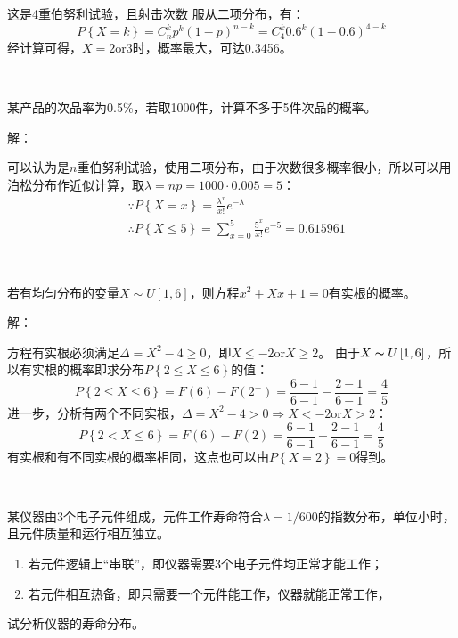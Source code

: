这是4重伯努利试验，且射击次数 服从二项分布，有：
\[
P\left\{ X=k \right\} =C_{n}^{k}p^k\left( 1-p \right) ^{n-k}=C_{4}^{k}0.6^k\left( 1-0.6 \right) ^{4-k}
\]
经计算可得，$X=2\mathrm{or}3$时，概率最大，可达0.3456。

~

\begin{example}
某产品的次品率为0.5\%，若取1000件，计算不多于5件次品的概率。
\end{example}

解：

可以认为是$n$重伯努利试验，使用二项分布，由于次数很多概率很小，所以可以用泊松分布作近似计算，取$\lambda =np=1000\cdot 0.005=5$：
\begin{align*}
&\because P\left\{ X=x \right\} =\frac{\lambda ^x}{x!}e^{-\lambda} \\
&\therefore P\left\{ X\leqslant 5 \right\} =\sum_{x=0}^5{\frac{5^x}{x!}e^{-5}}=0.615961
\end{align*}

~

\begin{example}
若有均匀分布的变量$X\sim U\left[ 1,6 \right] $，则方程$x^2+Xx+1=0$有实根的概率。
\end{example}

解：

方程有实根必须满足$\Delta =X^2-4\geqslant 0$，即$X\leqslant -2 \mathrm{or} X\geqslant 2$。
由于$X\thicksim U\left[ 1,6 \right] $，所以有实根的概率即求分布$P\left\{ 2\leqslant X\leqslant 6 \right\} $的值：
\[
P\left\{ 2\leqslant X\leqslant 6 \right\} =F\left( 6 \right) -F\left( 2^- \right) =\frac{6-1}{6-1}-\frac{2-1}{6-1}=\frac{4}{5}
\]
进一步，分析有两个不同实根，$\Delta =X^2-4>0\Rightarrow X<-2\mathrm{or}X>2$：
\[
P\left\{ 2<X\leqslant 6 \right\} =F\left( 6 \right) -F\left( 2 \right) =\frac{6-1}{6-1}-\frac{2-1}{6-1}=\frac{4}{5}
\]
有实根和有不同实根的概率相同，这点也可以由$P\left\{ X=2 \right\} =0$得到。

~

\begin{example}
某仪器由3个电子元件组成，元件工作寿命符合$\lambda =1/600$的指数分布，单位小时，且元件质量和运行相互独立。
\begin{enumerate}
    \item 若元件逻辑上“串联”，即仪器需要3个电子元件均正常才能工作；
    \item 若元件相互热备，即只需要一个元件能工作，仪器就能正常工作，
\end{enumerate}
试分析仪器的寿命分布。
\end{example}

